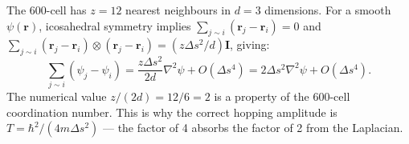 \documentclass[11pt,a4paper]{article}
\begin{document}
The 600-cell has $z=12$ nearest neighbours in $d=3$ dimensions.
For a smooth $\psi(\mathbf{r})$, icosahedral symmetry implies
$\sum_{j\sim i}(\mathbf{r}_j - \mathbf{r}_i) = 0$ and
$\sum_{j\sim i}(\mathbf{r}_j - \mathbf{r}_i)\otimes(\mathbf{r}_j - \mathbf{r}_i)
= (z\Delta s^2/d)\mathbf{I}$, giving:
\begin{equation}
\sum_{j\sim i}(\psi_j - \psi_i)
= \frac{z\Delta s^2}{2d}\nabla^2\psi + O(\Delta s^4)
= 2\Delta s^2\nabla^2\psi + O(\Delta s^4).
\label{eq:laplacian_proof}
\end{equation}
The numerical value $z/(2d) = 12/6 = 2$ is a property of the 600-cell
coordination number. This is why the correct hopping amplitude is
$T = \hbar^2/(4m\Delta s^2)$ — the factor of 4 absorbs the factor of 2
from the Laplacian.


\end{document}

